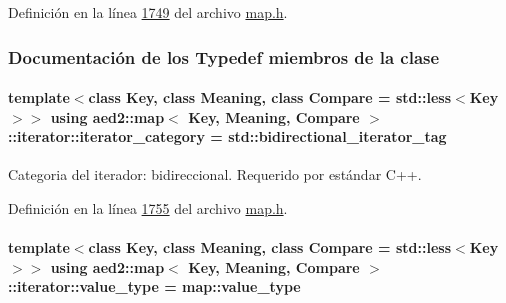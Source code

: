 Definición en la línea \hyperlink{map_8h_source_l01749}{1749} del archivo \hyperlink{map_8h_source}{map.\+h}.



\subsubsection{Documentación de los \textquotesingle{}Typedef\textquotesingle{} miembros de la clase}
\paragraph[{\texorpdfstring{iterator\+\_\+category}{iterator_category}}]{\setlength{\rightskip}{0pt plus 5cm}template$<$class Key, class Meaning, class Compare = std\+::less$<$\+Key$>$$>$ using {\bf aed2\+::map}$<$ Key, Meaning, Compare $>$\+::{\bf iterator\+::iterator\+\_\+category} =  std\+::bidirectional\+\_\+iterator\+\_\+tag}\hypertarget{classaed2_1_1map_1_1iterator_a709df3d8aef6fd1eeb839616b554ff0b_a709df3d8aef6fd1eeb839616b554ff0b}{}\label{classaed2_1_1map_1_1iterator_a709df3d8aef6fd1eeb839616b554ff0b_a709df3d8aef6fd1eeb839616b554ff0b}


Categoria del iterador\+: bidireccional. Requerido por estándar C++. 



Definición en la línea \hyperlink{map_8h_source_l01755}{1755} del archivo \hyperlink{map_8h_source}{map.\+h}.

\paragraph[{\texorpdfstring{value\+\_\+type}{value_type}}]{\setlength{\rightskip}{0pt plus 5cm}template$<$class Key, class Meaning, class Compare = std\+::less$<$\+Key$>$$>$ using {\bf aed2\+::map}$<$ Key, Meaning, Compare $>$\+::{\bf iterator\+::value\+\_\+type} =  {\bf map\+::value\+\_\+type}}\hypertarget{classaed2_1_1map_1_1iterator_a4e1d954ef5c6a64bbcd881854f039a16_a4e1d954ef5c6a64bbcd881854f039a16}{}\label{classaed2_1_1map_1_1iterator_a4e1d954ef5c6a64bbcd881854f039a16_a4e1d954ef5c6a64bbcd881854f039a16}


